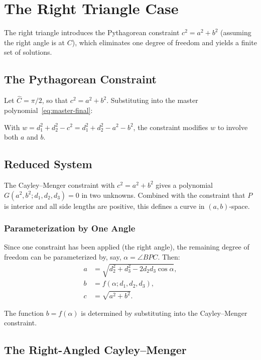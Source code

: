 
\chapter{The Right Triangle Case}
\label{ch:right}

The right triangle introduces the Pythagorean constraint $c^2 = a^2 + b^2$ (assuming the right angle is at $C$), which eliminates one degree of freedom and yields a finite set of solutions.

\section{The Pythagorean Constraint}

Let $\hat{C} = \pi/2$, so that $c^2 = a^2 + b^2$. Substituting into the master polynomial~\eqref{eq:master-final}:

With $w = d_1^2 + d_2^2 - c^2 = d_1^2 + d_2^2 - a^2 - b^2$, the constraint modifies $w$ to involve both $a$ and $b$.

\section{Reduced System}

The Cayley--Menger constraint with $c^2 = a^2 + b^2$ gives a polynomial $G(a^2, b^2; d_1, d_2, d_3) = 0$ in two unknowns. Combined with the constraint that $P$ is interior and all side lengths are positive, this defines a curve in $(a, b)$-space.

\subsection{Parameterization by One Angle}

Since one constraint has been applied (the right angle), the remaining degree of freedom can be parameterized by, say, $\alpha = \angle BPC$. Then:
\begin{align}
a &= \sqrt{d_2^2 + d_3^2 - 2d_2 d_3 \cos\alpha}, \\
b &= f(\alpha; d_1, d_2, d_3), \\
c &= \sqrt{a^2 + b^2}.
\end{align}

The function $b = f(\alpha)$ is determined by substituting into the Cayley--Menger constraint.

\section{The Right-Angled Cayley--Menger}

